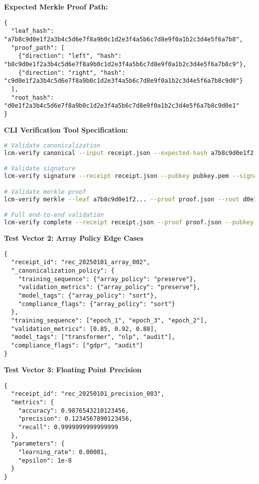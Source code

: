 \documentclass[12pt,a4paper]{article}
\begin{document}
\textbf{Expected Merkle Proof Path:}
\begin{lstlisting}[caption=Merkle Proof JSON]
{
  "leaf_hash": "a7b8c9d0e1f2a3b4c5d6e7f8a9b0c1d2e3f4a5b6c7d8e9f0a1b2c3d4e5f6a7b8",
  "proof_path": [
    {"direction": "left", "hash": "b8c9d0e1f2a3b4c5d6e7f8a9b0c1d2e3f4a5b6c7d8e9f0a1b2c3d4e5f6a7b8c9"},
    {"direction": "right", "hash": "c9d0e1f2a3b4c5d6e7f8a9b0c1d2e3f4a5b6c7d8e9f0a1b2c3d4e5f6a7b8c9d0"}
  ],
  "root_hash": "d0e1f2a3b4c5d6e7f8a9b0c1d2e3f4a5b6c7d8e9f0a1b2c3d4e5f6a7b8c9d0e1"
}
\end{lstlisting}

\textbf{CLI Verification Tool Specification:}
\begin{lstlisting}[language=bash, caption=Conformance Validation Commands]
# Validate canonicalization
lcm-verify canonical --input receipt.json --expected-hash a7b8c9d0e1f2...

# Validate signature
lcm-verify signature --receipt receipt.json --pubkey pubkey.pem --signature 1a2b3c4d5e6f...

# Validate merkle proof
lcm-verify merkle --leaf a7b8c9d0e1f2... --proof proof.json --root d0e1f2a3b4c5...

# Full end-to-end validation
lcm-verify complete --receipt receipt.json --proof proof.json --pubkey pubkey.pem
\end{lstlisting}

\textbf{Test Vector 2: Array Policy Edge Cases}
\begin{lstlisting}[caption=Array Policy Test Input]
{
  "receipt_id": "rec_20250101_array_002",
  "_canonicalization_policy": {
    "training_sequence": {"array_policy": "preserve"},
    "validation_metrics": {"array_policy": "preserve"},
    "model_tags": {"array_policy": "sort"},
    "compliance_flags": {"array_policy": "sort"}
  },
  "training_sequence": ["epoch_1", "epoch_3", "epoch_2"],
  "validation_metrics": [0.85, 0.92, 0.88],
  "model_tags": ["transformer", "nlp", "audit"],
  "compliance_flags": ["gdpr", "audit"]
}
\end{lstlisting}

\textbf{Test Vector 3: Floating Point Precision}
\begin{lstlisting}[caption=Precision Test Input]
{
  "receipt_id": "rec_20250101_precision_003",
  "metrics": {
    "accuracy": 0.9876543210123456,
    "precision": 0.1234567890123456,
    "recall": 0.9999999999999999
  },
  "parameters": {
    "learning_rate": 0.00001,
    "epsilon": 1e-8
  }
}
\end{lstlisting}
\end{document}
